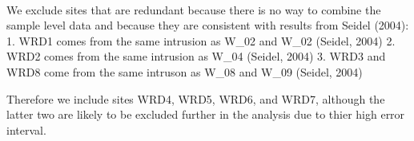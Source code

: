 \documentclass{article}
\begin{document}
    \begin{center}
    \end{center}
    { \hspace*{\fill} \\}
    
    We exclude sites that are redundant because there is no way to combine
the sample level data and because they are consistent with results from
Seidel (2004): 1. WRD1 comes from the same intrusion as W\_02 and W\_02
(Seidel, 2004) 2. WRD2 comes from the same intrusion as W\_04 (Seidel,
2004) 3. WRD3 and WRD8 come from the same intruson as W\_08 and W\_09
(Seidel, 2004)

Therefore we include sites WRD4, WRD5, WRD6, and WRD7, although the
latter two are likely to be excluded further in the analysis due to
thier high error interval.
\end{document}
